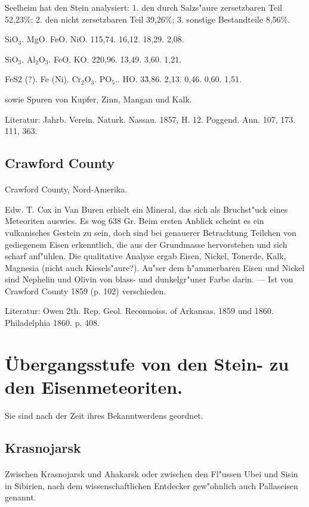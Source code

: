 \documentclass[a4paper, 11pt, oneside]{article}
\begin{document}
Seelheim hat den Stein analysiert: 1. den durch Salzs"aure zersetzbaren Teil 52,23\%; 2. den nicht zersetzbaren Teil 39,26\%; 3. sonstige Bestandteile 8,56\%.

SiO$_{3}$. MgO. FeO. NiO.  
1\. 15,74. 16,12. 18,29. 2,08.

SiO$_{3}$. Al$_{2}$O$_{3}$. FeO. KO.  
2\. 20,96. 13,49. 3,60. 1,21.

FeS2 (?). Fe (Ni). Cr$_{2}$O$_{3}$. PO$_{5}$.. HO.  
3\. 3,86. 2,13. 0,46. 0,60. 1,51.

sowie Spuren von Kupfer, Zinn, Mangan und Kalk.

Literatur: Jahrb. Verein. Naturk. Nassau. 1857, H. 12. Poggend. Ann. 107, 173. 111, 363.

\subsection{Crawford County}
\normalsize
\paragraph{}
Crawford County, Nord-Amerika.

Edw. T. Cox in Van Buren erhielt ein Mineral, das sich als Bruchst"uck eines Meteoriten auswies. Es wog 638 Gr. Beim ersten Anblick scheint es ein vulkanisches Gestein zu sein, doch sind bei genauerer Betrachtung Teilchen von gediegenem Eisen erkenntlich, die aus der Grundmasse hervorstehen und sich scharf anf"uhlen. Die qualitative Analyse ergab Eisen, Nickel, Tonerde, Kalk, Magnesia (nicht auch Kiesels"aure?). Au"ser dem h"ammerbaren Eisen und Nickel sind Nephelin und Olivin von blass- und dunkelgr"uner Farbe darin. --- Ist von Crawford County 1859 (p. 102) verschieden.

Literatur: Owen 2th. Rep. Geol. Reconnoiss. of Arkansas. 1859 und 1860. Philadelphia 1860. p. 408.

\section{Übergangsstufe von den Stein- zu den Eisenmeteoriten.}

Sie sind nach der Zeit ihres Bekanntwerdens geordnet.

\subsection{Krasnojarsk}
\normalsize
\paragraph{}
Zwischen Krasnojarsk und Ahakarsk oder zwischen den Fl"ussen Ubei und Sisin in Sibirien, nach dem wissenschaftlichen Entdecker gew"ohnlich auch Pallaseisen genannt.
\end{document}
